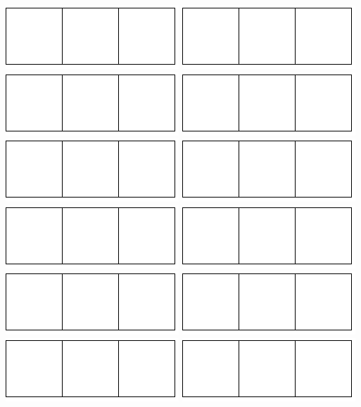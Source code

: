 \documentclass[a4paper]{oblivoir}
\begin{document}
\bigskip\noindent
\includegraphics[width=.2\textwidth]{2}\quad
\includegraphics[width=.2\textwidth]{2}\quad
\includegraphics[width=.2\textwidth]{2}\quad
\includegraphics[width=.2\textwidth]{2}\\[5pt]
\includegraphics[width=.2\textwidth]{2}\quad
\includegraphics[width=.2\textwidth]{2}\quad
\includegraphics[width=.2\textwidth]{2}\quad
\includegraphics[width=.2\textwidth]{2}\\[5pt]
\includegraphics[width=.2\textwidth]{2}\quad
\includegraphics[width=.2\textwidth]{2}\quad
\includegraphics[width=.2\textwidth]{2}\quad
\includegraphics[width=.2\textwidth]{2}\\[5pt]
\end{document}
